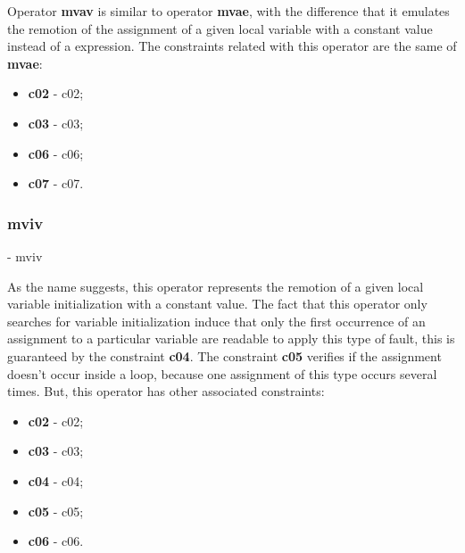 	Operator \textbf{\ac{mvav}} is similar to operator \textbf{\ac{mvae}}, with the difference that it emulates the remotion of the assignment of a given local variable with a constant value instead of a expression. The constraints related with this operator are the same of \textbf{\ac{mvae}}:

	\begin{itemize}
		\item \textbf{\acs{c02}} - \Acl{c02};
		\item \textbf{\acs{c03}} - \Acl{c03};
		\item \textbf{\acs{c06}} - \Acl{c06};
		\item \textbf{\acs{c07}} - \Acl{c07}.
	\end{itemize}

	\subsubsection{\textbf{\acs{mviv}}} - \Acl{mviv}
	\hypertarget{mviv}{}

	As the name suggests, this operator represents the remotion of a given local variable initialization with a constant value. The fact that this operator only searches for variable initialization induce that only the first occurrence of an assignment to a particular variable are readable to apply this type of fault, this is guaranteed by the constraint \textbf{\acs{c04}}. The constraint \textbf{\acs{c05}} verifies if the assignment doesn't occur inside a loop, because one assignment of this type occurs several times. But, this operator has other associated constraints:

	\begin{itemize}
		\item \textbf{\acs{c02}} - \Acl{c02};
		\item \textbf{\acs{c03}} - \Acl{c03};
		\item \textbf{\acs{c04}} - \Acl{c04};
		\item \textbf{\acs{c05}} - \Acl{c05};
		\item \textbf{\acs{c06}} - \Acl{c06}.
	\end{itemize}




